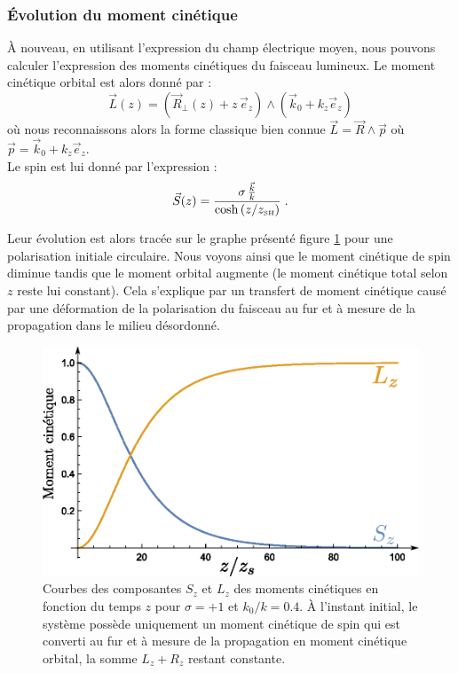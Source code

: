 \documentclass[a4paper,11pt]{article} %
\begin{document}
	\subsubsection{\'Evolution du moment cinétique}
	\`A nouveau, en utilisant l'expression du champ électrique moyen, nous pouvons calculer l'expression des moments cinétiques du faisceau lumineux. Le moment cinétique orbital est alors donné par :
	\begin{equation*}
		\label{exp_L(z)}
		\vec{L}(z) = \left(\vec{R}_\perp(z) + z \, \vec{e}_z \right) \wedge ( \vec{k}_0 + k_z \vec{e}_z ) 
	\end{equation*}
	où nous reconnaissons alors la forme classique bien connue $ \vec{L} = \vec{R} \wedge \vec{p} $ où $ \vec{p} = \vec{k}_0 + k_z \vec{e}_z $.\\
	
	Le spin est lui donné par l'expression :
	\begin{equation}
		\label{exp_S(z)}
		\vec{S}(z) =  \frac{ \sigma \, \frac{\vec{k}}{k} }{ \cosh \left( z/z_\text{{\tiny SH}} \right) } \; .
	\end{equation}
	
	Leur évolution est alors tracée sur le graphe présenté figure \ref{fig:conversion_moment_cinetique} pour une polarisation initiale circulaire. Nous voyons ainsi que le moment cinétique de spin diminue tandis que le moment orbital augmente (le moment cinétique total selon $ z $ reste lui constant). Cela s'explique par un transfert de moment cinétique causé par une déformation de la polarisation du faisceau au fur et à mesure de la propagation dans le milieu désordonné.
	
	\begin{figure}[h]
		\centering
		\begin{minipage}[c]{0.85\linewidth}
			\centering
			\includegraphics[width=0.7\linewidth]{./Illustrations/Plot_conversion_L-S.eps}
			\caption{Courbes des composantes $ S_z $ et $ L_z $ des moments cinétiques en fonction du temps $ z $ pour $ \sigma = + 1 $ et $ k_0 / k = 0.4 $. \`{A} l'instant initial, le système possède uniquement un moment cinétique de spin qui est converti au fur et à mesure de la propagation en moment cinétique orbital, la somme $ L_z + R_z $ restant constante.}
			\label{fig:conversion_moment_cinetique}
		\end{minipage}
	\end{figure}
	
\end{document}
